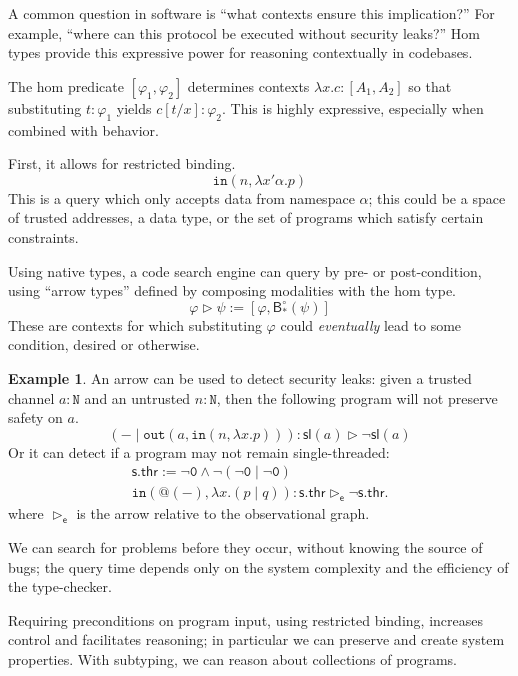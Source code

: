 \documentclass[conference]{IEEEtran}
\theoremstyle{definition}
\newtheorem{example}[theorem]{Example}
\newcommand{\msf}[1]{\mathsf{#1}}
\newcommand{\mtt}[1]{\mathtt{#1}}
\newcommand{\N}{\mtt{N}}
\newcommand{\tto}{\mtt{out}}
\newcommand{\tti}{\mtt{in}}
\newcommand{\ttz}{\mtt{0}}
\begin{document}
A common question in software is ``what contexts ensure this implication?'' For example, ``where can this protocol be executed without security leaks?'' Hom types provide this expressive power for reasoning contextually in codebases.

The hom predicate $[\varphi_1,\varphi_2]$
determines contexts $\lambda x.c:[A_1,A_2]$ so that substituting $t:\varphi_1$ yields $c[t/x]:\varphi_2$. This is highly expressive, especially when combined with behavior.

First, it allows for restricted binding.
\[\tti(n,\lambda x'\alpha.p)\]
This is a query which only accepts data from namespace $\alpha$; this could be a space of trusted addresses, a data type, or the set of programs which satisfy certain constraints.

Using native types, a code search engine can query by pre- or post-condition, using ``arrow types'' defined by composing modalities with the hom type.
\[\varphi \rhd \psi := [\varphi,\msf{B}^\circ_*(\psi)]\]
These are contexts for which substituting $\varphi$ could \textit{eventually} lead to some condition, desired or otherwise.

\begin{example}
    An arrow can be used to detect security leaks: given a trusted channel $a:\N$ and an untrusted $n:\N$, then the following program will not preserve safety on $a$.
    \[(- \;|\; \tto(a,\tti(n,\lambda x.p))): \msf{sl}(a)\rhd \neg\msf{sl}(a)\]
    Or it can detect if a program may not remain single-threaded:
    \[\begin{array}{c}
        \msf{s.thr}:= \neg \ttz\land \neg(\neg \ttz \;|\; \neg\ttz)\\
        \tti(@(-),\lambda x.(p \;|\; q)) : \msf{s.thr}\rhd_\msf{e} \neg\msf{s.thr}.
    \end{array}\]
    where $\rhd_\msf{e}$ is the arrow relative to the observational graph.
    
    We can search for problems before they occur, without knowing the source of bugs; the query time depends only on the system complexity and the efficiency of the type-checker.
\end{example}

Requiring preconditions on program input, using restricted binding, increases control and facilitates reasoning; in particular we can preserve and create system properties. With subtyping, we can reason about collections of programs.
\end{document}
